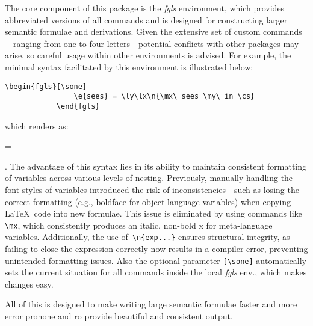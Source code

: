 \documentclass[10pt, a4paper]{article}
\begin{document}
	The core component of this package is the \textit{fgls} environment, which provides abbreviated versions of all commands and is designed for constructing larger semantic formulae and derivations. Given the extensive set of custom commands—ranging from one to four letters—potential conflicts with other packages may arise, so careful usage within other environments is advised.
	For example, the minimal syntax facilitated by this environment is illustrated below:
	\begin{lstlisting}[style=B]
			\begin{fgls}[\sone]
				\e{sees} = \ly\lx\n{\mx\ sees \my\ in \cs}
			\end{fgls}
	\end{lstlisting} which renders as: 
	\begin{fgls}[\sone]
		 = \ly\lx{}
	\end{fgls}.
	The advantage of this syntax lies in its ability to maintain consistent formatting of variables across various levels of nesting. Previously, manually handling the font styles of variables introduced the risk of in\-con\-sis\-ten\-cies—such as losing the correct formatting (e.g., boldface for object-language variables) when copying \LaTeX\ code into new formulae. This issue is eliminated by using commands like \verb=\mx=, which consistently produces an italic, non-bold x for meta-language variables. Additionally, the use of\ \verb=\n{exp...}= ensures structural integrity, as failing to close the expression correctly now results in a compiler error, preventing unintended formatting issues. Also the optional parameter \verb=[\sone]= automatically sets the current situation for all commands inside the local \textit{fgls} env., which makes changes easy.
	
	All of this is designed to make writing large semantic formulae faster and more error pronone and ro provide beautiful and consistent output.
\end{document}
